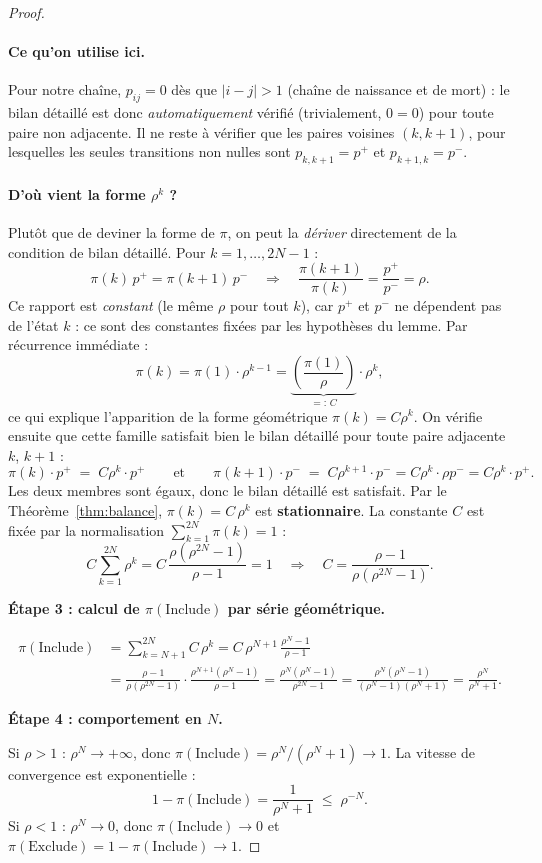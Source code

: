 \documentclass[12pt,a4paper]{article}
\theoremstyle{remark}
\newcommand{\Inc}{\ensuremath{\mathrm{Include}}}
\newcommand{\Exc}{\ensuremath{\mathrm{Exclude}}}
\begin{document}
\begin{proof}
\paragraph{Ce qu'on utilise ici.}
Pour notre chaîne, $p_{ij}=0$ dès que $|i-j|>1$ (chaîne de naissance et de mort) : le
bilan détaillé est donc \emph{automatiquement} vérifié (trivialement, $0=0$) pour toute
paire non adjacente.  Il ne reste à vérifier que les paires voisines $(k,k+1)$, pour
lesquelles les seules transitions non nulles sont $p_{k,k+1}=p^+$ et $p_{k+1,k}=p^-$.

\paragraph{D'où vient la forme $\rho^k$ ?}
Plutôt que de deviner la forme de $\pi$, on peut la \emph{dériver} directement de la
condition de bilan détaillé.  Pour $k=1,\ldots,2N-1$ :
\[
  \pi(k)\,p^+ = \pi(k+1)\,p^-
  \quad\Longrightarrow\quad
  \frac{\pi(k+1)}{\pi(k)} = \frac{p^+}{p^-} = \rho.
\]
Ce rapport est \emph{constant} (le même $\rho$ pour tout $k$), car $p^+$ et $p^-$ ne
dépendent pas de l'état $k$ : ce sont des constantes fixées par les hypothèses du lemme.
Par récurrence immédiate :
\[
  \pi(k) = \pi(1)\cdot \rho^{k-1} = \underbrace{\left(\frac{\pi(1)}{\rho}\right)}_{=:\,C} \cdot \rho^k,
\]
ce qui explique l'apparition de la forme géométrique $\pi(k)=C\rho^k$.  On vérifie
ensuite que cette famille satisfait bien le bilan détaillé pour toute paire adjacente
$k$, $k+1$ :
\[
  \pi(k)\cdot p^+ \;=\; C\rho^k\cdot p^+
  \qquad \text{et} \qquad
  \pi(k+1)\cdot p^- \;=\; C\rho^{k+1}\cdot p^- = C\rho^k \cdot \rho p^- = C\rho^k \cdot p^+.
\]
Les deux membres sont égaux, donc le bilan détaillé est satisfait.
Par le Théorème~\ref{thm:balance}, $\pi(k) = C\,\rho^k$ est \textbf{stationnaire}.
La constante $C$ est fixée par la normalisation $\sum_{k=1}^{2N}\pi(k)=1$ :
\[
  C \sum_{k=1}^{2N}\rho^k = C\,\frac{\rho(\rho^{2N}-1)}{\rho-1} = 1
  \quad\Longrightarrow\quad
  C = \frac{\rho-1}{\rho(\rho^{2N}-1)}.
\]

\medskip
\textbf{Étape 3 : calcul de $\pi(\Inc)$ par série géométrique.}

\begin{align*}
  \pi(\Inc) &= \sum_{k=N+1}^{2N} C\,\rho^k
              = C\,\rho^{N+1}\,\frac{\rho^N - 1}{\rho - 1}\\[6pt]
            &= \frac{\rho-1}{\rho(\rho^{2N}-1)}\cdot\frac{\rho^{N+1}(\rho^N-1)}{\rho-1}
             = \frac{\rho^N(\rho^N-1)}{\rho^{2N}-1}
             = \frac{\rho^N(\rho^N-1)}{(\rho^N-1)(\rho^N+1)}
             = \frac{\rho^N}{\rho^N+1}.
\end{align*}

\medskip
\textbf{Étape 4 : comportement en $N$.}

Si $\rho > 1$ : $\rho^N \to +\infty$, donc $\pi(\Inc) = \rho^N/(\rho^N+1) \to 1$.
La vitesse de convergence est exponentielle :
\[
  1 - \pi(\Inc) = \frac{1}{\rho^N+1} \;\le\; \rho^{-N}.
\]
Si $\rho < 1$ : $\rho^N \to 0$, donc $\pi(\Inc)\to 0$ et $\pi(\Exc) = 1-\pi(\Inc)\to 1$.
\end{proof}
\end{document}
